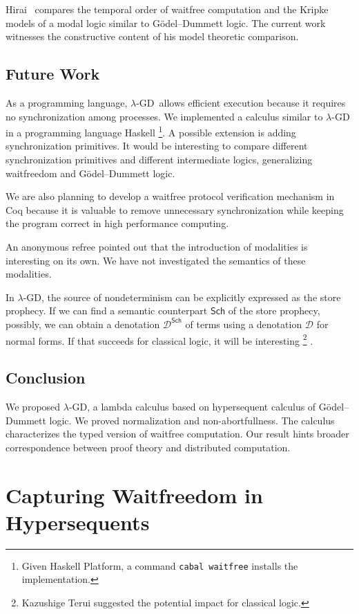 \documentclass[doctor]{iscs-thesis}
\newcommand{\lgd}{$\lambda$-GD}
\begin{document}
Hirai~\cite{hirailpar} compares the temporal order of waitfree
computation and the Kripke models of a modal logic similar to
G\"odel--Dummett logic.  The current
work witnesses the constructive content of
his model theoretic comparison.

\section{Future Work}
\label{future}

As a programming language, \lgd\, allows efficient execution because it
requires no synchronization among processes.
We implemented a calculus similar to \lgd\, in a programming language
Haskell%
\footnote{Given Haskell Platform, a command \texttt{cabal
waitfree} installs the implementation.}.
A possible extension is adding synchronization primitives.
It would be interesting to compare different synchronization primitives
and different intermediate logics, generalizing waitfreedom and
G\"odel--Dummett logic.

We are also planning to develop a waitfree protocol verification mechanism in Coq
because it is valuable to
remove unnecessary synchronization while keeping the program correct
in high performance computing.

An anonymous refree pointed out that the introduction of
modalities is interesting on its own.
We have not investigated the semantics of these modalities.

In \lgd, the source of nondeterminism can be explicitly expressed as the
store prophecy.
If we can find a semantic counterpart $\mathsf{Sch}$ of the store
prophecy, possibly, we
can obtain a denotation $\mathcal{D}^\mathsf{Sch}$ of terms
using a denotation $\mathcal{D}$ for normal forms.
If that succeeds for classical logic, it will be interesting%
\footnote{Kazushige Terui suggested the potential impact for classical logic.}%
.

\section{Conclusion}
\label{conc}
We proposed \lgd, a lambda calculus
based on hypersequent calculus of 
G\"odel--Dummett logic.
We proved normalization and non-abortfullness.
The calculus characterizes
the typed version of waitfree computation.
Our result 
hints broader correspondence between
proof theory and distributed computation.

\chapter{Capturing Waitfreedom in Hypersequents}
\end{document}
